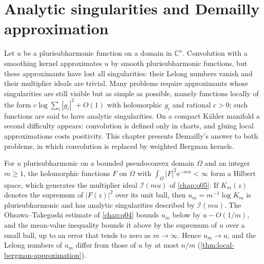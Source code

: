\chapter{Analytic singularities and Demailly approximation}
\label{chap:q06}

Let $u$ be a plurisubharmonic function on a domain in $\mathbb C^n$. Convolution with a smoothing kernel approximates $u$ by smooth plurisubharmonic functions, but these approximants have lost all singularities: their Lelong numbers vanish and their multiplier ideals are trivial. Many problems require approximants whose singularities are still visible but as simple as possible, namely functions locally of the form $c\log\sum_i|g_i|^2+O(1)$ with holomorphic $g_i$ and rational $c>0$; such functions are said to have analytic singularities. On a compact K\"ahler manifold a second difficulty appears: convolution is defined only in charts, and gluing local approximations costs positivity. This chapter presents Demailly's answer to both problems, in which convolution is replaced by weighted Bergman kernels.

For $u$ plurisubharmonic on a bounded pseudoconvex domain $\Omega$ and an integer $m\geq1$, the holomorphic functions $F$ on $\Omega$ with $\int_\Omega|F|^2\mathrm e^{-mu}<\infty$ form a Hilbert space, which generates the multiplier ideal $\mathcal I(mu)$ of \cref{chap:q05}. If $K_m(z)$ denotes the supremum of $|F(z)|^2$ over its unit ball, then $u_m=m^{-1}\log K_m$ is plurisubharmonic and has analytic singularities described by $\mathcal I(mu)$. The Ohsawa--Takegoshi estimate of \cref{chap:q04} bounds $u_m$ below by $u-O(1/m)$, and the mean-value inequality bounds it above by the supremum of $u$ over a small ball, up to an error that tends to zero as $m\to\infty$. Hence $u_m\to u$, and the Lelong numbers of $u_m$ differ from those of $u$ by at most $n/m$ (\cref{thm:local-bergman-approximation}).

